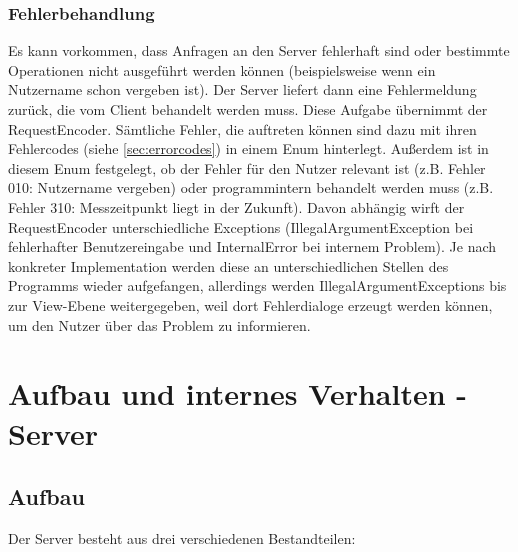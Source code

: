 \documentclass[parskip=full,11pt]{scrartcl}
\begin{document}
\subsubsection{Fehlerbehandlung} \label{sec:error}

Es kann vorkommen, dass Anfragen an den Server fehlerhaft sind oder bestimmte 
Operationen nicht ausgeführt werden können (beispielsweise wenn ein Nutzername 
schon vergeben ist). Der Server liefert dann eine Fehlermeldung zurück, die vom 
Client behandelt werden muss. Diese Aufgabe übernimmt der RequestEncoder. 
Sämtliche Fehler, die auftreten können sind dazu mit ihren Fehlercodes (siehe 
\ref{sec:errorcodes}) in einem Enum hinterlegt. Außerdem ist in diesem Enum 
festgelegt, ob der Fehler für den Nutzer relevant ist (z.B. Fehler 010: 
Nutzername vergeben) oder programmintern behandelt werden muss (z.B. Fehler 
310: Messzeitpunkt liegt in der Zukunft). Davon abhängig wirft der 
RequestEncoder unterschiedliche Exceptions (IllegalArgumentException bei 
fehlerhafter Benutzereingabe und InternalError bei internem Problem). Je nach 
konkreter Implementation werden diese an unterschiedlichen Stellen des 
Programms wieder aufgefangen, allerdings werden IllegalArgumentExceptions bis 
zur View-Ebene weitergegeben, weil dort Fehlerdialoge erzeugt werden können, um 
den Nutzer über das Problem zu informieren.




\pagebreak
\section{Aufbau und internes Verhalten - Server}

\subsection{Aufbau}
Der Server besteht aus drei verschiedenen Bestandteilen:
\end{document}
